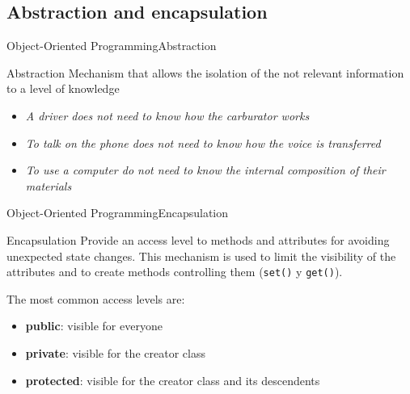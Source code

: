 \documentclass[10pt,compress]{beamer} %
\begin{document}
\subsection{Abstraction and encapsulation}

\begin{frame}{Object-Oriented Programming}{Abstraction}
	\begin{block}{Abstraction}
		Mechanism that allows the isolation of the not relevant information to a level of knowledge
  	\end{block}	
	
	\begin{itemize}
		\item \textit{A driver does not need to know how the carburator works} 
		\item \textit{To talk on the phone does not need to know how the voice is transferred} 
		\item \textit{To use a computer do not need to know the internal composition of their materials}
		
	\end{itemize}
\end{frame}

\begin{frame}{Object-Oriented Programming}{Encapsulation}
	\begin{block}{Encapsulation}
		Provide an access level to methods and attributes for avoiding unexpected state changes. This mechanism is used to limit the visibility of the attributes and to create methods controlling them (\texttt{set()} y \texttt{get()}).
  	\end{block}	
	
	The most common access levels are:
	
	\begin{itemize}
		\item \textbf{public}: visible for everyone
		\item \textbf{private}: visible for the creator class
		\item \textbf{protected}: visible for the creator class and its descendents
	\end{itemize}
\end{frame}

\end{document}
